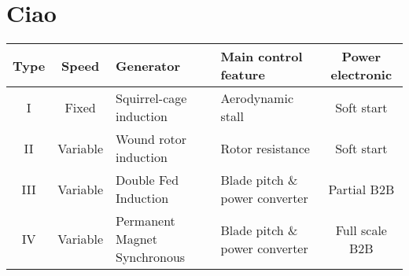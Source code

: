 \documentclass[11pt, a4paper]{article}
\begin{document}
\section{Ciao}
\begin{table}[h]
  \centering
  \begin{tabular}{ccMMc}
    \toprule
  Type & Speed & Generator & Main control feature & Power electronic\\ \midrule
   I & Fixed & Squirrel-cage induction & Aerodynamic stall & Soft start \\ 
   II & Variable & Wound rotor induction &  Rotor resistance & Soft start\\
   III & Variable & Double Fed Induction &  Blade pitch \& power converter & Partial B2B\\
   IV & Variable & Permanent Magnet Synchronous &  Blade pitch \& power converter & Full scale B2B\\
   \bottomrule
  \end{tabular}
\end{table}
\end{document}
